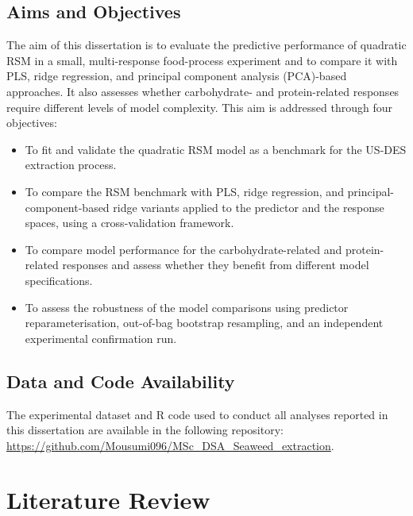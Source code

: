 \documentclass[MScDSA]{uccthesis}
\begin{document}
\section{Aims and Objectives}
\label{sec:aims_and_objectives}
The aim of this dissertation is to evaluate the predictive performance of quadratic RSM in a small, multi-response food-process experiment and to compare it with PLS, ridge regression, and principal component analysis (PCA)-based approaches. It also assesses whether carbohydrate- and protein-related responses require different levels of model complexity. This aim is addressed through four objectives:
\begin{itemize}
    \item To fit and validate the quadratic RSM model as a benchmark for the US-DES extraction process.
    \item To compare the RSM benchmark with PLS, ridge regression, and principal-component-based ridge variants applied to the predictor and the response spaces, using a cross-validation framework.
    \item To compare model performance for the carbohydrate-related and protein-related responses and assess whether they benefit from different model specifications.
    \item To assess the robustness of the model comparisons using predictor reparameterisation, out-of-bag bootstrap resampling, and an independent experimental confirmation run.
\end{itemize}

\section{Data and Code Availability}
The experimental dataset and R code used to conduct all analyses reported in this dissertation are available in the following repository: \url{https://github.com/Mousumi096/MSc_DSA_Seaweed_extraction}. 

\chapter{Literature Review}
\label{chap:literature_review}
\end{document}
